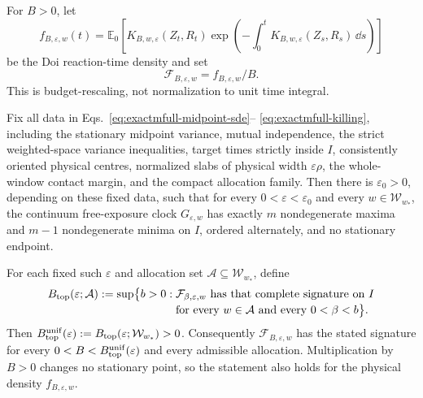 For \(B>0\), let
\begin{equation}
 f_{B,\varepsilon,w}(t)
 =\mathbb E_0\!\left[
 K_{B,w,\varepsilon}(Z_t,R_t)
 \exp\!\left(-\int_0^tK_{B,w,\varepsilon}(Z_s,R_s)\,\dd s\right)
 \right]
 \label{eq:exactmfull-reaction-density}
\end{equation}
be the Doi reaction-time density and set
\begin{equation}
 \mathcal F_{B,\varepsilon,w}=f_{B,\varepsilon,w}/B.
 \label{eq:exactmfull-rescaled-density}
\end{equation}
This is budget-rescaling, not normalization to unit time integral.

\begin{theorem}
\label{thm:exactmfull-doi}
Fix all data in Eqs.~\eqref{eq:exactmfull-midpoint-sde}--
\eqref{eq:exactmfull-killing}, including the stationary midpoint variance,
mutual independence, the strict weighted-space variance inequalities, target
times strictly inside \(I\), consistently oriented physical centres,
normalized slabs of physical width \(\varepsilon\rho\), the whole-window
contact margin, and the compact allocation family.  Then there is
\(\varepsilon_0>0\), depending on these fixed data, such that for every
\(0<\varepsilon<\varepsilon_0\) and every
\(w\in\mathcal W_{w_*}\), the continuum free-exposure clock
\(G_{\varepsilon,w}\) has exactly \(m\) nondegenerate maxima and \(m-1\)
nondegenerate minima on \(I\), ordered alternately, and no stationary
endpoint.

For each fixed such \(\varepsilon\) and allocation set
\(\mathcal A\subseteq\mathcal W_{w_*}\), define
\begin{align}
 B_{\rm top}(\varepsilon;\mathcal A)
 :=\sup\bigl\{b>0:\;&
 \mathcal F_{\beta,\varepsilon,w}
 \text{ has that complete signature on }I
 \nonumber\\[-2pt]
 &\text{for every }w\in\mathcal A
 \text{ and every }0<\beta<b\bigr\}.
 \label{eq:exactmfull-btop}
\end{align}
Then
\(B_{\rm top}^{\rm unif}(\varepsilon):=
B_{\rm top}(\varepsilon;\mathcal W_{w_*})>0\).
Consequently \(\mathcal F_{B,\varepsilon,w}\) has the stated signature for
every \(0<B<B_{\rm top}^{\rm unif}(\varepsilon)\) and every admissible
allocation.  Multiplication by \(B>0\) changes no stationary point, so the
statement also holds for the physical density \(f_{B,\varepsilon,w}\).
\end{theorem}

